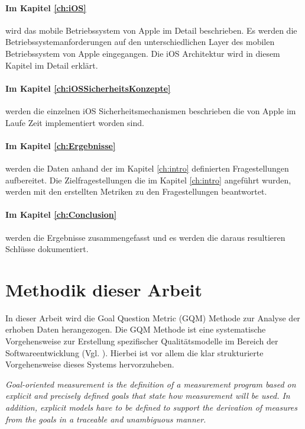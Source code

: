 \paragraph{Im Kapitel \ref{ch:iOS}} wird das mobile Betriebssystem von Apple im Detail beschrieben. Es werden die Betriebssystemanforderungen auf den unterschiedlichen Layer des mobilen Betriebssystem von Apple eingegangen. Die iOS Architektur wird in diesem Kapitel im Detail erklärt. 

\paragraph{Im Kapitel \ref{ch:iOSSicherheitsKonzepte}} werden die einzelnen iOS Sicherheitsmechanismen beschrieben die von Apple im Laufe Zeit implementiert worden sind.

\paragraph{Im Kapitel \ref{ch:Ergebnisse}} werden die Daten anhand der im Kapitel \ref{ch:intro} definierten Fragestellungen aufbereitet. Die Zielfragestellungen die im Kapitel \ref{ch:intro} angeführt wurden, werden mit den erstellten Metriken zu den Fragestellungen beantwortet.

\paragraph{Im Kapitel \ref{ch:Conclusion}} werden die Ergebnisse zusammengefasst und es werden die daraus resultieren Schlüsse dokumentiert.

\section{Methodik dieser Arbeit}
\label{sec:MethArbeit}
In dieser Arbeit wird die Goal Question Metric (GQM) Methode zur Analyse der erhoben Daten herangezogen. Die GQM Methode ist eine systematische Vorgehensweise zur Erstellung spezifischer Qualitätsmodelle im Bereich der Softwareentwicklung (Vgl. \cite{GQM[1], GQM[2]}).  Hierbei ist vor allem die klar strukturierte Vorgehensweise dieses Systems hervorzuheben.\par

\textit{\glqq Goal-oriented measurement is the definition of a measurement program based on explicit and precisely defined goals that state how measurement will be used. In addition, explicit models have to be defined to support the derivation of measures from the goals in a traceable and unambiguous manner.\grqq{}} \cite{GQM[5]}
 
